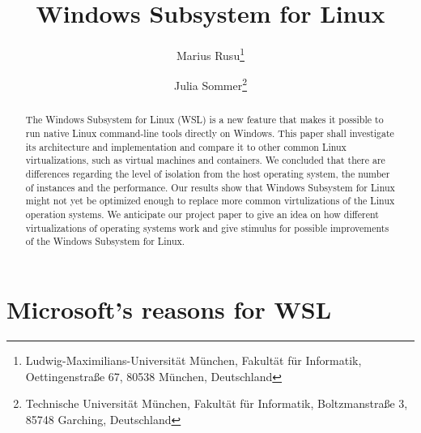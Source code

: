 \documentclass[utf8,biblatex, ngerman, english]{lni}
\begin{document}
\title[WSL]{Windows Subsystem for Linux}
\author[Marius Rusu \and Julia Sommer]
{Marius Rusu\footnote{Ludwig-Maximilians-Universität München, Fakultät für Informatik, Oettingenstraße 67, 80538 München, Deutschland } \and
 Julia Sommer\footnote{Technische Universität München, Fakultät für Informatik, Boltzmanstraße 3, 85748 Garching, Deutschland }}
\maketitle
\newpage
\newpage

\begin{abstract}
The Windows Subsystem for Linux (WSL) is a new feature that makes it possible to run native Linux command-line tools directly on Windows. This paper shall investigate its architecture and implementation and compare it to other common Linux virtualizations, such as virtual machines and containers. We concluded that there are differences regarding the level of isolation from the host operating system, the number of instances and the performance. Our results show that Windows Subsystem for Linux might not yet be optimized enough to replace more common virtulizations of the Linux operation systems. We anticipate our project paper to give an idea on how different virtualizations of operating systems work and give stimulus for possible improvements of the Windows Subsystem for Linux. 
\end{abstract}


\section{Microsoft's reasons for WSL}
\end{document}
